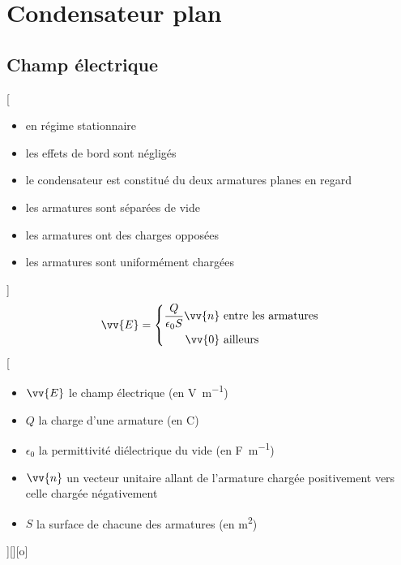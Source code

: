 

\section{Condensateur plan}

\subsection{Champ électrique}

[
    \begin{itemize}
        \item en régime stationnaire
        \item les effets de bord sont négligés
        \item le condensateur est constitué du deux armatures planes en regard
        \item les armatures sont séparées de vide
        \item les armatures ont des charges opposées
        \item les armatures sont uniformément chargées
    \end{itemize}
]
{$$\vv{E}=\left\lbrace
    \begin{aligned}
        \frac{Q}{\epsilon_0S}\vv{n} &\text{ entre les armatures}\\
        \vv{0} &\text{ ailleurs}
    \end{aligned}\right.$$}
[
    \schema{}{3cm}
    \begin{itemize}
        \item $\vv{E}$ le champ électrique (en \unit{V.m^{-1}})
        \item $Q$ la charge d'une armature (en \unit{C})
        \item $\epsilon_0$ la permittivité diélectrique du vide (en \unit{F.m^{-1}})
        \item $\vv{n}$ un vecteur unitaire allant de l'armature chargée positivement vers celle chargée négativement
        \item $S$ la surface de chacune des armatures (en \unit{m^2})
    \end{itemize}
][][o]

